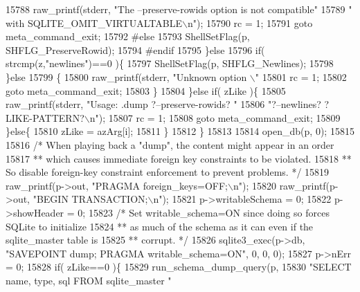 \begin{DoxyCode}
{{{{{{{{{{15788           raw_printf(stderr, \textcolor{stringliteral}{"The --preserve-rowids option is not compatible"}
15789                              \textcolor{stringliteral}{" with SQLITE\_OMIT\_VIRTUALTABLE\(\backslash\)n"});
15790           rc = 1;
15791           \textcolor{keywordflow}{goto} meta\_command\_exit;
15792 \textcolor{preprocessor}{#else}
15793           ShellSetFlag(p, SHFLG_PreserveRowid);
15794 \textcolor{preprocessor}{#endif}
15795         \}\textcolor{keywordflow}{else}
15796         \textcolor{keywordflow}{if}( strcmp(z,\textcolor{stringliteral}{"newlines"})==0 )\{
15797           ShellSetFlag(p, SHFLG_Newlines);
15798         \}\textcolor{keywordflow}{else}
15799         \{
15800           raw_printf(stderr, \textcolor{stringliteral}{"Unknown option \(\backslash\)"%
15801           rc = 1;
15802           \textcolor{keywordflow}{goto} meta\_command\_exit;
15803         \}
15804       \}\textcolor{keywordflow}{else} \textcolor{keywordflow}{if}( zLike )\{
15805         raw_printf(stderr, \textcolor{stringliteral}{"Usage: .dump ?--preserve-rowids? "}
15806                            \textcolor{stringliteral}{"?--newlines? ?LIKE-PATTERN?\(\backslash\)n"});
15807         rc = 1;
15808         \textcolor{keywordflow}{goto} meta\_command\_exit;
15809       \}\textcolor{keywordflow}{else}\{
15810         zLike = azArg[i];
15811       \}
15812     \}
15813 
15814     open_db(p, 0);
15815 
15816     \textcolor{comment}{/* When playing back a "dump", the content might appear in an order}
15817 \textcolor{comment}{    ** which causes immediate foreign key constraints to be violated.}
15818 \textcolor{comment}{    ** So disable foreign-key constraint enforcement to prevent problems. */}
15819     raw_printf(p->out, \textcolor{stringliteral}{"PRAGMA foreign\_keys=OFF;\(\backslash\)n"});
15820     raw_printf(p->out, \textcolor{stringliteral}{"BEGIN TRANSACTION;\(\backslash\)n"});
15821     p->writableSchema = 0;
15822     p->showHeader = 0;
15823     \textcolor{comment}{/* Set writable\_schema=ON since doing so forces SQLite to initialize}
15824 \textcolor{comment}{    ** as much of the schema as it can even if the sqlite\_master table is}
15825 \textcolor{comment}{    ** corrupt. */}
15826     sqlite3_exec(p->db, \textcolor{stringliteral}{"SAVEPOINT dump; PRAGMA writable\_schema=ON"}, 0, 0, 0);
15827     p->nErr = 0;
15828     \textcolor{keywordflow}{if}( zLike==0 )\{
15829       run_schema_dump_query(p,
15830         \textcolor{stringliteral}{"SELECT name, type, sql FROM sqlite\_master "}
}}}}}}}}}}}
\end{DoxyCode}
